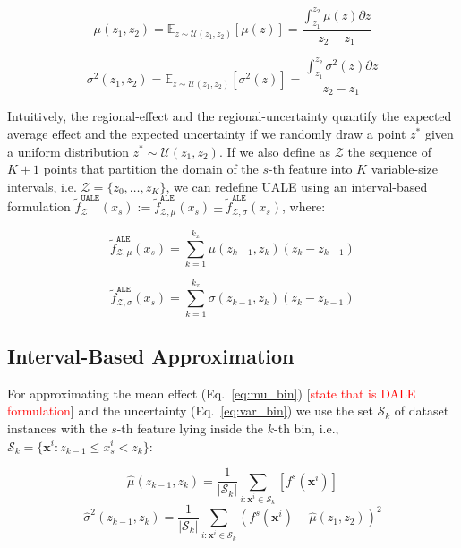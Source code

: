 \documentclass[twoside]{article}
\newcommand{\dfdx}{f^s}
\newcommand{\todo}[1]{[\textcolor{red}{#1}]}
\begin{document}
\begin{equation}
  \label{eq:mu_bin}
    \mu(z_1, z_2) = \mathbb{E}_{z \sim \mathcal{U}(z_1,z_2)} [\mu(z)]
    = \frac{\int_{z_1}^{z_2} \mu(z) \partial z}{z_2 - z_1}
\end{equation}

\begin{equation}
  \label{eq:var_bin}
  \sigma^2(z_1, z_2) = \mathbb{E}_{z \sim \mathcal{U}(z_1,z_2)} [\sigma^2(z)] =  \frac{\int_{z_1}^{z_2} \sigma^2(z)  \partial z}{z_2 - z_1}
\end{equation}

%
Intuitively, the regional-effect and the regional-uncertainty quantify
the expected average effect and the expected uncertainty if we
randomly draw a point \(z^*\) given a uniform distribution
\(z^* \sim \mathcal{U}(z_1, z_2)\). If we also define as
\(\mathcal{Z}\) the sequence of \(K+1\) points that partition the
domain of the \(s\)-th feature into \(K\) variable-size intervals,
i.e.  \(\mathcal{Z} = \{z_0, \ldots, z_K\}\), we can redefine UALE
using an interval-based formulation
\(\tilde{f}^{\mathtt{UALE}}_{\mathcal{Z}}(x_s):= \tilde{f}^{\mathtt{ALE}}_{\mathcal{Z}, \mu}(x_s)
\pm \tilde{f}^{\mathtt{ALE}}_{\mathcal{Z}, \sigma}(x_s)\), where:

\begin{equation}
  \label{eq:ALE_2}
  \tilde{f}^{\mathtt{ALE}}_{\mathcal{Z}, \mu}(x_s) = \sum_{k=1}^{k_x} \mu(z_{k-1}, z_k) (z_k - z_{k-1})
\end{equation}

\begin{equation}
  \label{eq:ALE_accumulated_var}
  \tilde{f}^{\mathtt{ALE}}_{\mathcal{Z}, \sigma}(x_s) =  \sum_{k=1}^{k_x} \sigma(z_{k-1}, z_k) (z_k - z_{k-1})
\end{equation}
%


\subsection{Interval-Based Approximation}
\label{sec:UALE-approximation}

For approximating the mean effect (Eq.~\eqref{eq:mu_bin}) \todo{state that is 
  DALE formulation} and the uncertainty (Eq.~\eqref{eq:var_bin}) we use the set
\(\mathcal{S}_k\) of dataset instances with the \(s\)-th feature lying
inside the \(k\)-th bin, i.e.,
\( \mathcal{S}_k= \{ \mathbf{x}^i : z_{k-1} \leq x^i_s < z_k \} \):

\begin{equation}
  \label{eq:2}
  \hat{\mu}(z_{k-1}, z_k) = \frac{1}{|\mathcal{S}_k|}
  \sum_{i:\mathbf{x}^i \in \mathcal{S}_k} \left [ \dfdx(\mathbf{x}^i)
  \right ]
\end{equation}
%
\begin{equation}
  \label{eq:3}
  \hat{\sigma}^2(z_{k-1}, z_k) = \frac{1}{|\mathcal{S}_k|}
\sum_{i:\mathbf{x}^i \in \mathcal{S}_k} \left ( \dfdx(\mathbf{x}^i) -
  \hat{\mu}(z_1, z_2) \right )^2
\end{equation}
\end{document}
